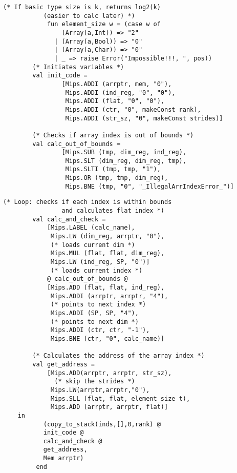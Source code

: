 \documentclass[12pt,a4paper,english]{article}
\begin{document}
\begin{lstlisting}[caption=Compiler.sml task 4. (continued from listing 14)]
            (* If basic type size is k, returns log2(k) 
	       (easier to calc later) *)
            fun element_size w = (case w of 
                (Array(a,Int)) => "2" 
              | (Array(a,Bool)) => "0" 
              | (Array(a,Char)) => "0"
              | _ => raise Error("Impossible!!!, ", pos))
	    (* Initiates variables *)
	    val init_code =
    	        [Mips.ADDI (arrptr, mem, "0"),
     	         Mips.ADDI (ind_reg, "0", "0"),
     	         Mips.ADDI (flat, "0", "0"),
     	         Mips.ADDI (ctr, "0", makeConst rank),
     	         Mips.ADDI (str_sz, "0", makeConst strides)]

	    (* Checks if array index is out of bounds *)
	    val calc_out_of_bounds =
    	        [Mips.SUB (tmp, dim_reg, ind_reg),
     	         Mips.SLT (dim_reg, dim_reg, tmp),
     	         Mips.SLTI (tmp, tmp, "1"),
     	         Mips.OR (tmp, tmp, dim_reg),
     	         Mips.BNE (tmp, "0", "_IllegalArrIndexError_")]
\end{lstlisting}
\newpage
\begin{lstlisting}[caption=Compiler.sml task 4. (continued from listing 15)]
	    (* Loop: checks if each index is within bounds 
    	        and calculates flat index *)
	    val calc_and_check =
    		[Mips.LABEL (calc_name),
     		 Mips.LW (dim_reg, arrptr, "0"),    
		     (* loads current dim *)
     		 Mips.MUL (flat, flat, dim_reg), 
     	 	 Mips.LW (ind_reg, SP, "0")]        
		     (* loads current index *)
     		@ calc_out_of_bounds @
    		[Mips.ADD (flat, flat, ind_reg), 
     		 Mips.ADDI (arrptr, arrptr, "4"),   
		     (* points to next index *)
     		 Mips.ADDI (SP, SP, "4"),           
		     (* points to next dim *)
     		 Mips.ADDI (ctr, ctr, "-1"),
     		 Mips.BNE (ctr, "0", calc_name)]

	    (* Calculates the address of the array index *)
  	    val get_address =
      		[Mips.ADD(arrptr, arrptr, str_sz),      
  	  	      (* skip the strides *)
       		 Mips.LW(arrptr,arrptr,"0"),
       		 Mips.SLL (flat, flat, element_size t),
       		 Mips.ADD (arrptr, arrptr, flat)]
	in
           (copy_to_stack(inds,[],0,rank) @
           init_code @
           calc_and_check @
           get_address,
           Mem arrptr)
         end    
\end{lstlisting}
\newpage
\end{document}

